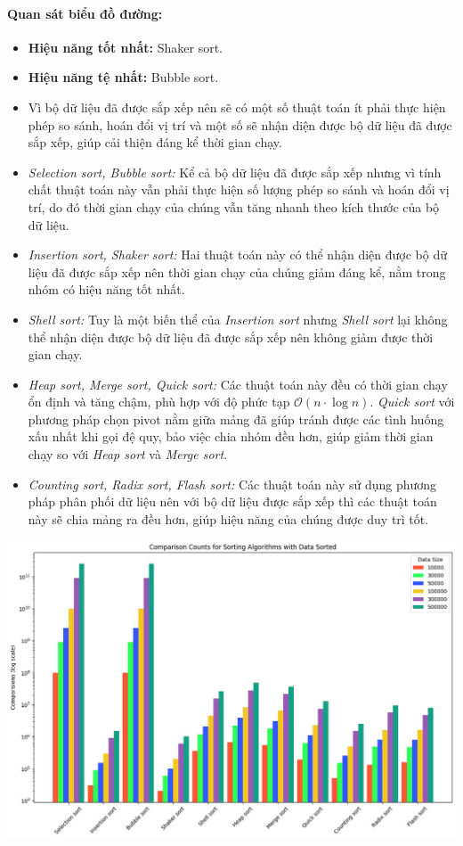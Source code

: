    \paragraph{Quan sát biểu đồ đường:}
    \begin{itemize}
        \item \textbf{Hiệu năng tốt nhất:} Shaker sort.
        \item \textbf{Hiệu năng tệ nhất:} Bubble sort.
        \item Vì bộ dữ liệu đã được sắp xếp nên sẽ có một số thuật toán ít phải thực hiện phép so sánh, hoán đổi vị trí và một số sẽ nhận diện được bộ dữ liệu đã được sắp xếp, giúp cải thiện đáng kể thời gian chạy.
        \item \textit{Selection sort, Bubble sort: } Kể cả bộ dữ liệu đã được sắp xếp nhưng vì tính chất thuật toán này vẫn phải thực hiện số lượng phép so sánh và hoán đổi vị trí, do đó thời gian chạy của chúng vẫn tăng nhanh theo kích thước của bộ dữ liệu.
        \item \textit{Insertion sort, Shaker sort: } Hai thuật toán này có thể nhận diện được bộ dữ liệu đã được sắp xếp nên thời gian chạy của chúng giảm đáng kể, nằm trong nhóm có hiệu năng tốt nhất.
        \item \textit{Shell sort: } Tuy là một biến thể của \textit{Insertion sort} nhưng \textit{Shell sort} lại không thể nhận diện được bộ dữ liệu đã được sắp xếp nên không giảm được thời gian chạy.
        \item \textit{Heap sort, Merge sort, Quick sort:} Các thuật toán này đều có thời gian chạy ổn định và tăng chậm, phù hợp với độ phức tạp $\mathcal{O}(n \cdot \log n)$. \textit{Quick sort} với phương pháp chọn pivot nằm giữa mảng đã giúp tránh được các tình huống xấu nhất khi gọi đệ quy, bảo việc chia nhóm đều hơn, giúp giảm thời gian chạy so với \textit{Heap sort} và \textit{Merge sort}.
        \item \textit{Counting sort, Radix sort, Flash sort:} Các thuật toán này sử dụng phương pháp phân phối dữ liệu nên với bộ dữ liệu được sắp xếp thì các thuật toán này sẽ chia mảng ra đều hơn, giúp hiệu năng của chúng được duy trì tốt.
    \end{itemize}    

    \newpage
    \includegraphics[width = 1\linewidth]{img/experiment/comparison/COMPARISON_SORTED.jpg}

